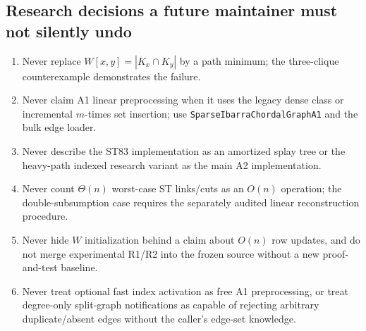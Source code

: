 \subsection{Research decisions a future maintainer must not silently undo}
\begin{enumerate}[leftmargin=*]
\item Never replace \(W[x,y]=|K_x\cap K_y|\) by a path minimum; the three-clique counterexample demonstrates the failure.
\item Never claim A1 linear preprocessing when it uses the legacy dense class or incremental \(m\)-times set insertion; use \texttt{SparseIbarraChordalGraphA1} and the bulk edge loader.
\item Never describe the ST83 implementation as an amortized splay tree or the heavy-path indexed research variant as the main A2 implementation.
\item Never count \(\Theta(n)\) worst-case ST links/cuts as an \(O(n)\) operation; the double-subsumption case requires the separately audited linear reconstruction procedure.
\item Never hide \(W\) initialization behind a claim about \(O(n)\) row updates, and do not merge experimental R1/R2 into the frozen source without a new proof-and-test baseline.
\item Never treat optional fast index activation as free A1 preprocessing, or treat degree-only split-graph notifications as capable of rejecting arbitrary duplicate/absent edges without the caller's edge-set knowledge.
\end{enumerate}

